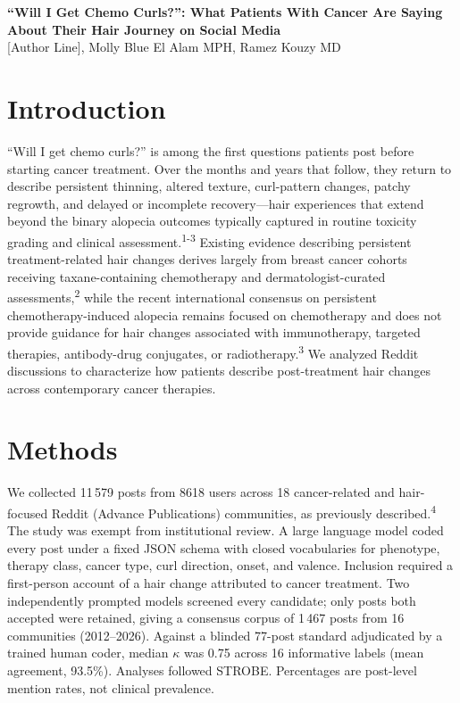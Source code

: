 \documentclass[11pt]{article}
\begin{document}
\begin{center}
{\large\bfseries ``Will I Get Chemo Curls?'': What Patients With Cancer Are Saying\\About Their Hair Journey on Social Media}\\[6pt]
[Author Line], Molly Blue El Alam MPH, Ramez Kouzy MD
\end{center}

\section*{Introduction}
``Will I get chemo curls?'' is among the first questions patients post before starting cancer treatment. Over the months and years that follow, they return to describe persistent thinning, altered texture, curl-pattern changes, patchy regrowth, and delayed or incomplete recovery---hair experiences that extend beyond the binary alopecia outcomes typically captured in routine toxicity grading and clinical assessment.\textsuperscript{1-3} Existing evidence describing persistent treatment-related hair changes derives largely from breast cancer cohorts receiving taxane-containing chemotherapy and dermatologist-curated assessments,\textsuperscript{2} while the recent international consensus on persistent chemotherapy-induced alopecia remains focused on chemotherapy and does not provide guidance for hair changes associated with immunotherapy, targeted therapies, antibody-drug conjugates, or radiotherapy.\textsuperscript{3} We analyzed Reddit discussions to characterize how patients describe post-treatment hair changes across contemporary cancer therapies.

\section*{Methods}
We collected 11\,579 posts from 8618 users across 18 cancer-related and hair-focused Reddit (Advance Publications) communities, as previously described.\textsuperscript{4} The study was exempt from institutional review. A large language model coded every post under a fixed JSON schema with closed vocabularies for phenotype, therapy class, cancer type, curl direction, onset, and valence. Inclusion required a first-person account of a hair change attributed to cancer treatment. Two independently prompted models screened every candidate; only posts both accepted were retained, giving a consensus corpus of 1\,467 posts from 16 communities (2012--2026). Against a blinded 77-post standard adjudicated by a trained human coder, median $\kappa$ was 0.75 across 16 informative labels (mean agreement, 93.5\%). Analyses followed STROBE. Percentages are post-level mention rates, not clinical prevalence.
\end{document}
